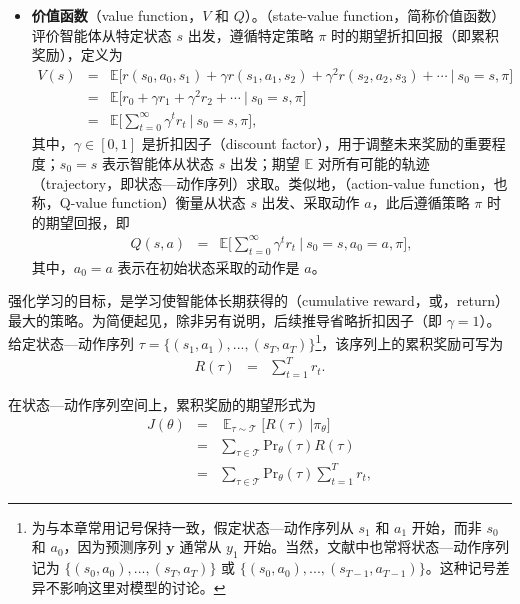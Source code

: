 \begin{itemize}
\item \vspace{0.3em} \textbf{价值函数}（value function，$V$ 和 $Q$）。（state-value function，简称价值函数）评价智能体从特定状态 $s$ 出发，遵循特定策略 $\pi$ 时的期望折扣回报（即累积奖励），定义为
    \begin{eqnarray}
    V(s) & = & \mathbb{E} \Big[ r(s_0,a_0,s_1) + \gamma r(s_1,a_1,s_2) + \gamma^2 r(s_2,a_2,s_3) + \cdots \ \big | \ s_0 = s, \pi \Big] \nonumber \\
         & = & \mathbb{E} \Big[ r_0 + \gamma r_1 + \gamma^2 r_2 + \cdots \ \big | \ s_0 = s, \pi \Big] \nonumber \\
         & = & \mathbb{E} \Big[ \sum_{t=0}^{\infty} \gamma^{t} r_t \ \big | \ s_0 = s, \pi \Big], \label{eq:general-value-function}
    \end{eqnarray}
    \noindent 其中，$\gamma \in [0,1]$ 是折扣因子（discount factor），用于调整未来奖励的重要程度；$s_0 = s$ 表示智能体从状态 $s$ 出发；期望 $\mathbb{E}$ 对所有可能的轨迹（trajectory，即状态—动作序列）求取。类似地，（action-value function，也称，Q-value function）衡量从状态 $s$ 出发、采取动作 $a$，此后遵循策略 $\pi$ 时的期望回报，即
    \begin{eqnarray}
    Q(s,a) & = & \mathbb{E} \Big[ \sum_{t=0}^{\infty} \gamma^{t} r_t \ \big | \ s_0 = s, a_0 = a, \pi \Big],
    \end{eqnarray}
    \noindent 其中，$a_0 = a$ 表示在初始状态采取的动作是 $a$。
\end{itemize}
\vspace{0.5em}

强化学习的目标，是学习使智能体长期获得的（cumulative reward，或，return）最大的策略。为简便起见，除非另有说明，后续推导省略折扣因子（即 $\gamma = 1$）。给定状态—动作序列 $\tau = \{(s_1,a_1),...,(s_T,a_T)\}$\footnote{为与本章常用记号保持一致，假定状态—动作序列从 $s_1$ 和 $a_1$ 开始，而非 $s_0$ 和 $a_0$，因为预测序列 $\mathbf{y}$ 通常从 $y_1$ 开始。当然，文献中也常将状态—动作序列记为 $\{(s_0,a_0),...,(s_T,a_T)\}$ 或 $\{(s_0,a_0),...,(s_{T-1},a_{T-1})\}$。这种记号差异不影响这里对模型的讨论。}，该序列上的累积奖励可写为
\begin{eqnarray}
R(\tau) & = & \sum_{t=1}^{T} r_t. \label{eq:rl-sequence-reward}
\end{eqnarray}

在状态—动作序列空间上，累积奖励的期望形式为
\begin{eqnarray}
J(\theta) & = & \mathop{\mathbb{E}}_{\tau \sim \mathcal{T}} \Big[ R(\tau) \ \big | \pi_{\theta} \Big] \nonumber \\
          & = & \sum_{\tau \in \mathcal{T}} \mathrm{Pr}_{\theta}(\tau) R(\tau) \nonumber \\
          & = & \sum_{\tau \in \mathcal{T}} \mathrm{Pr}_{\theta}(\tau) \sum_{t=1}^{T} r_t, \label{eq:performance-function-basic}
\end{eqnarray}


